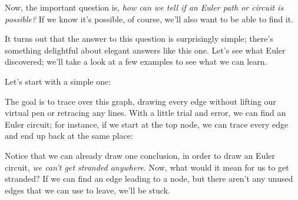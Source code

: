 Now, the important question is, \emph{how can we tell if an Euler path or circuit is possible?}  If we know it's possible, of course, we'll also want to be able to find it.

It turns out that the answer to this question is surprisingly simple; there's something delightful about elegant answers like this one.  Let's see what Euler discovered; we'll take a look at a few examples to see what we can learn.
\pagebreak

Let's start with a simple one:
\begin{center}
\end{center}

The goal is to trace over this graph, drawing every edge without lifting our virtual pen or retracing any lines.  With a little trial and error, we can find an Euler circuit; for instance, if we start at the top node, we can trace every edge and end up back at the same place:
\begin{center}
\end{center}

Notice that we can already draw one conclusion, in order to draw an Euler circuit, \emph{we can't get stranded anywhere}.  Now, what would it mean for us to get stranded?  If we can find an edge leading to a node, but there aren't any unused edges that we can use to leave, we'll be stuck.\\

